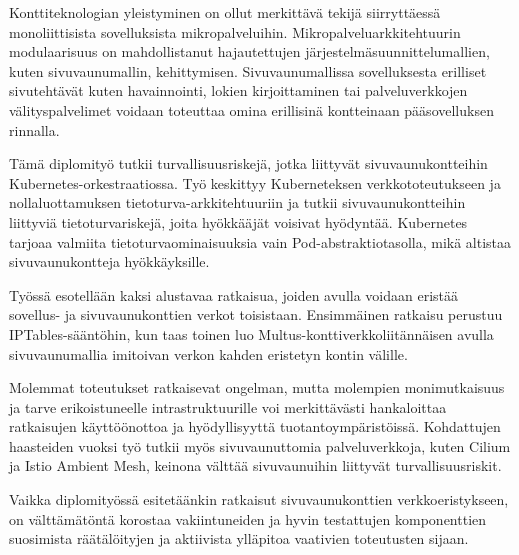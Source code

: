 \documentclass[english, 12pt, a4paper, sci, utf8, a-2b, online]{aaltothesis}
\begin{document}
\newpage

\date{29.12.2023}


\begin{abstractpage}[finnish]
  Konttiteknologian yleistyminen on ollut merkittävä tekijä siirryttäessä monoliittisista sovelluksista mikropalveluihin.
  Mikropalveluarkkitehtuurin modulaarisuus on mahdollistanut hajautettujen järjestelmäsuunnittelumallien, kuten sivuvaunumallin, kehittymisen.
  Sivuvaunumallissa sovelluksesta erilliset sivutehtävät kuten havainnointi, lokien kirjoittaminen tai palveluverkkojen välityspalvelimet voidaan toteuttaa omina erillisinä kontteinaan pääsovelluksen rinnalla.

  Tämä diplomityö tutkii turvallisuusriskejä, jotka liittyvät sivuvaunukontteihin Kubernetes-orkestraatiossa.
  Työ keskittyy Kuberneteksen verkkototeutukseen ja nollaluottamuksen tietoturva-arkkitehtuuriin ja tutkii sivuvaunukontteihin liittyviä tietoturvariskejä, joita hyökkääjät voisivat hyödyntää.
  Kubernetes tarjoaa valmiita tietoturvaominaisuuksia vain Pod-abstraktiotasolla, mikä altistaa sivuvaunukontteja hyökkäyksille.

  Työssä esotellään kaksi alustavaa ratkaisua, joiden avulla voidaan eristää sovellus- ja sivuvaunukonttien verkot toisistaan.
  Ensimmäinen ratkaisu perustuu IPTables-sääntöhin, kun taas toinen luo Multus-konttiverkkoliitännäisen avulla sivuvaunumallia imitoivan verkon kahden eristetyn kontin välille.

  Molemmat toteutukset ratkaisevat ongelman, mutta molempien monimutkaisuus ja tarve erikoistuneelle intrastruktuurille voi merkittävästi hankaloittaa ratkaisujen käyttöönottoa ja hyödyllisyyttä tuotantoympäristöissä.
  Kohdattujen haasteiden vuoksi työ tutkii myös sivuvaunuttomia palveluverkkoja, kuten Cilium ja Istio Ambient Mesh, keinona välttää sivuvaunuihin liittyvät turvallisuusriskit.

  Vaikka diplomityössä esitetäänkin ratkaisut sivuvaunukonttien verkkoeristykseen, on välttämätöntä korostaa vakiintuneiden ja hyvin testattujen komponenttien suosimista räätälöityjen ja aktiivista ylläpitoa vaativien toteutusten sijaan.
\end{abstractpage}
\end{document}
